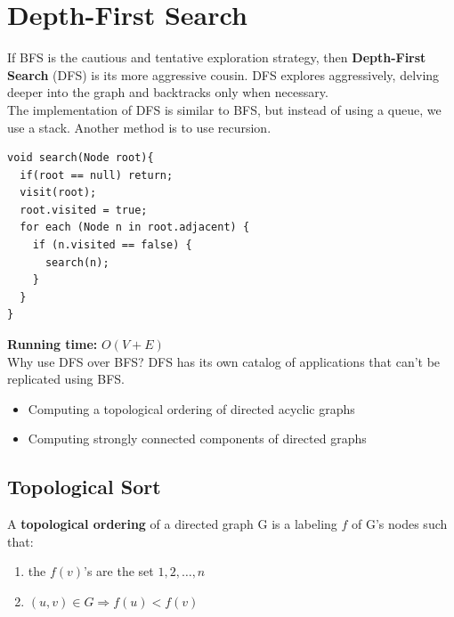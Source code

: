 \documentclass[]{book}
\newcommand{\runtime}[1]{\textbf{Running time:} $O(#1)$\\}
\begin{document}
    \section{Depth-First Search}
    If BFS is the cautious and tentative exploration strategy, then \textbf{Depth-First Search}
    (DFS) is its more aggressive cousin. DFS explores aggressively, delving deeper
    into the graph and backtracks only when necessary.\\
    \indent The implementation of DFS is similar to BFS, but instead of using a queue, we
    use a stack. Another method is to use recursion.\\
    \begin{Verbatim}
void search(Node root){
  if(root == null) return;
  visit(root);
  root.visited = true;
  for each (Node n in root.adjacent) {
    if (n.visited == false) {
      search(n);
    }
  }
}
    \end{Verbatim}
    \runtime{V + E}
    Why use DFS over BFS? DFS has its own catalog of applications that can't be replicated
    using BFS.
    \begin{itemize}
      \item Computing a topological ordering of directed acyclic graphs
      \item Computing strongly connected components of directed graphs
    \end{itemize}

      \subsection*{Topological Sort}
      A \textbf{topological ordering} of a directed graph G
      is a labeling $f$ of G's nodes such that:
      \begin{enumerate}
        \item the $f(v)$'s are the set ${1,2,\ldots, n}$
        \item $(u,v) \in G \Rightarrow f(u) < f(v)$
      \end{enumerate}
\end{document}
